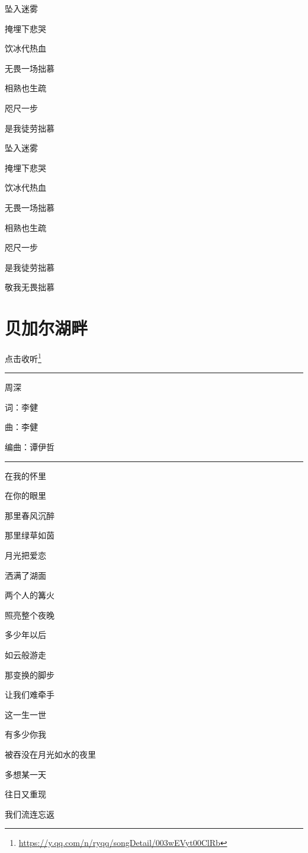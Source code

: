 \documentclass[]{ctexbook}
\renewcommand{\href}[2]{#2\footnote{\url{#1}}}
\begin{document}
坠入迷雾

掩埋下悲哭

饮冰代热血

无畏一场拙慕

相熟也生疏

咫尺一步

是我徒劳拙慕

坠入迷雾

掩埋下悲哭

饮冰代热血

无畏一场拙慕

相熟也生疏

咫尺一步

是我徒劳拙慕

敬我无畏拙慕

\section*{贝加尔湖畔}\label{lake-baikal}


\href{https://y.qq.com/n/ryqq/songDetail/003wEVyt00ClRb}{点击收听}

\begin{center}\rule{0.5\linewidth}{0.5pt}\end{center}

周深

词：李健

曲：李健

编曲：谭伊哲

\begin{center}\rule{0.5\linewidth}{0.5pt}\end{center}

在我的怀里

在你的眼里

那里春风沉醉

那里绿草如茵

月光把爱恋

洒满了湖面

两个人的篝火

照亮整个夜晚

多少年以后

如云般游走

那变换的脚步

让我们难牵手

这一生一世

有多少你我

被吞没在月光如水的夜里

多想某一天

往日又重现

我们流连忘返
\end{document}
